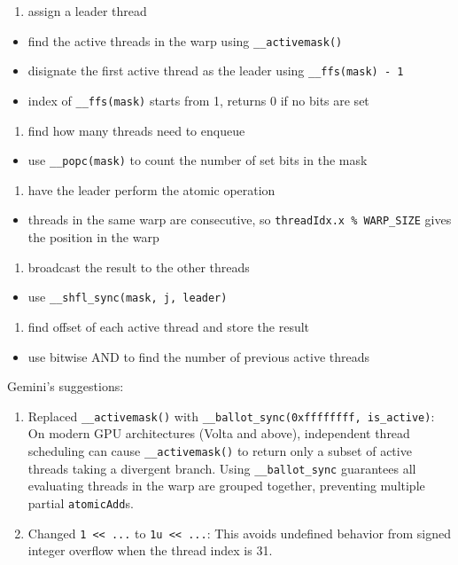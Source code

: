 \documentclass{article}
\begin{document}
\begin{enumerate}
\item assign a leader thread
\end{enumerate}
\begin{itemize}
\item find the active threads in the warp using \texttt{\_\_activemask()}
\item disignate the first active thread as the leader using \texttt{\_\_ffs(mask) - 1}
\item index of \texttt{\_\_ffs(mask)} starts from 1, returns 0 if no bits are set
\end{itemize}
\begin{enumerate}
\item find how many threads need to enqueue
\end{enumerate}
\begin{itemize}
\item use \texttt{\_\_popc(mask)} to count the number of set bits in the mask
\end{itemize}
\begin{enumerate}
\item have the leader perform the atomic operation
\end{enumerate}
\begin{itemize}
\item threads in the same warp are consecutive, so \texttt{threadIdx.x \% WARP\_SIZE} gives the position in the warp
\end{itemize}
\begin{enumerate}
\item broadcast the result to the other threads
\end{enumerate}
\begin{itemize}
\item use \texttt{\_\_shfl\_sync(mask, j, leader)}
\end{itemize}
\begin{enumerate}
\item find offset of each active thread and store the result
\end{enumerate}
\begin{itemize}
\item use bitwise AND to find the number of previous active threads

\end{itemize}
Gemini's suggestions:

\begin{enumerate}
\item Replaced \texttt{\_\_activemask()} with \texttt{\_\_ballot\_sync(0xffffffff, is\_active)}: On modern GPU architectures (Volta and above), independent thread scheduling can cause \texttt{\_\_activemask()} to return only a subset of active threads taking a divergent branch. Using \texttt{\_\_ballot\_sync} guarantees all evaluating threads in the warp are grouped together, preventing multiple partial \texttt{atomicAdd}s.
\item Changed \texttt{1 << ...} to \texttt{1u << ...}: This avoids undefined behavior from signed integer overflow when the thread index is 31.
\end{enumerate}
\end{document}

